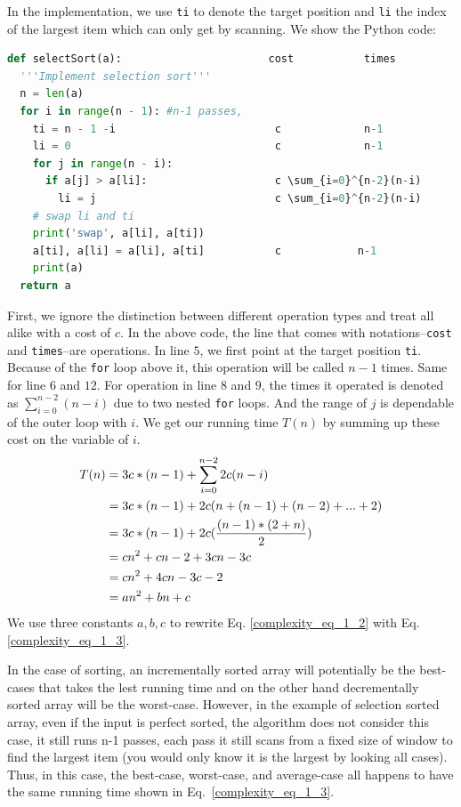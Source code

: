 \documentclass[../main.tex]{subfiles}
\begin{document}
In the implementation, we use \texttt{ti} to denote the target position and \texttt{li} the index of the largest item which can only get by scanning. We show the Python code:
\begin{lstlisting}[language=Python]
def selectSort(a):                       cost           times
  '''Implement selection sort'''
  n = len(a)
  for i in range(n - 1): #n-1 passes, 
    ti = n - 1 -i                         c             n-1        
    li = 0                                c             n-1
    for j in range(n - i):
      if a[j] > a[li]:                    c \sum_{i=0}^{n-2}(n-i) 
        li = j                            c \sum_{i=0}^{n-2}(n-i)
    # swap li and ti
    print('swap', a[li], a[ti])
    a[ti], a[li] = a[li], a[ti]           c            n-1
    print(a)
  return a
\end{lstlisting}
First, we ignore the distinction between different operation types and treat all alike with a cost of $c$. In the above code, the line that comes with notations--\texttt{cost} and \texttt{times}--are operations. In line $5$, we first point at the target position \texttt{ti}. Because of the \texttt{for} loop above it, this operation will be called $n-1$ times. Same for line $6$ and $12$. For operation in line $8$ and $9$, the times it operated is denoted as $\sum_{i=0}^{n-2}(n-i)$ due to two nested \texttt{for} loops. And the range of $j$ is dependable of the outer loop with $i$.  We get our running time $T(n)$ by summing up these cost on the variable of $i$.
\begin{align}
\label{complexity_eq_1}
    T(n) &= 3c*(n-1) + \sum_{i=0}^{n-2} {2c(n-i)}\\
    &= 3c*(n-1) + 2c (n+(n-1)+(n-2)+...+2) \notag \\
    &= 3c*(n-1) + 2c (\frac{(n-1)*(2+n)}{2})\notag \\
    &=cn^2+cn-2+3cn-3c\notag \\
    &=cn^2+4cn-3c-2\label{complexity_eq_1_2} \\
    &=an^2+bn+c\label{complexity_eq_1_3}
\end{align}
We use three constants $a, b, c$ to rewrite Eq. \ref{complexity_eq_1_2} with Eq.\ref{complexity_eq_1_3}. 

In the case of sorting, an incrementally sorted array will potentially be the best-cases that takes the lest running time and on the other hand decrementally sorted array will be the worst-case. However, in the example of selection sorted array, even if the input is perfect sorted, the algorithm does not consider this case, it still runs n-1 passes, each pass it still scans from a fixed size of window to find the largest item (you would only know it is the largest by looking all cases). Thus, in this case, the best-case, worst-case, and average-case all happens to have the same running time shown in Eq.~\ref{complexity_eq_1_3}. 
\end{document}
